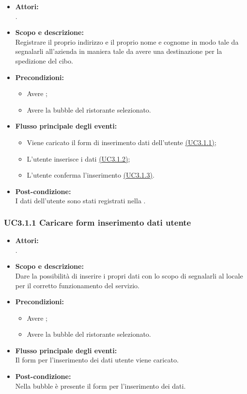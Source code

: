 \begin{itemize}
	\item \textbf{Attori:}
	\\.
	\item \textbf{Scopo e descrizione:} 
	\\Registrare il proprio indirizzo e il proprio nome e cognome in modo tale da segnalarli all’azienda in maniera tale da avere una destinazione per la spedizione del cibo.
	\item \textbf{Precondizioni:}
	\begin{itemize}
		\item Avere ;
		\item Avere la bubble del ristorante selezionato.
	\end{itemize}
	\item \textbf{Flusso principale degli eventi:}
	\begin{itemize}
		\item Viene caricato il form di inserimento dati dell’utente \hyperref[UC3.1.1]{(UC3.1.1)};
		\item L’utente inserisce i dati \hyperref[UC3.1.2]{(UC3.1.2)};
		\item L’utente conferma l’inserimento \hyperref[UC3.1.3]{(UC3.1.3)}.
	\end{itemize}
	\item \textbf{Post-condizione:}
	\\I dati dell’utente sono stati registrati nella .
\end{itemize}

\subsubsection{UC3.1.1 Caricare form inserimento dati utente} \label{UC3.1.1}

\begin{itemize}
	\item \textbf{Attori:}
	\\.
	\item \textbf{Scopo e descrizione:} 
	\\Dare la possibilità di inserire i propri dati con lo scopo di segnalarli al locale per il corretto funzionamento del servizio.
	\item \textbf{Precondizioni:}
	\begin{itemize}
		\item Avere ;
		\item Avere la bubble del ristorante selezionato.
	\end{itemize}
	\item \textbf{Flusso principale degli eventi:}
	\\Il form per l’inserimento dei dati utente viene caricato.
	\item \textbf{Post-condizione:}
	\\Nella bubble è presente il form per l'inserimento dei dati.
\end{itemize}

